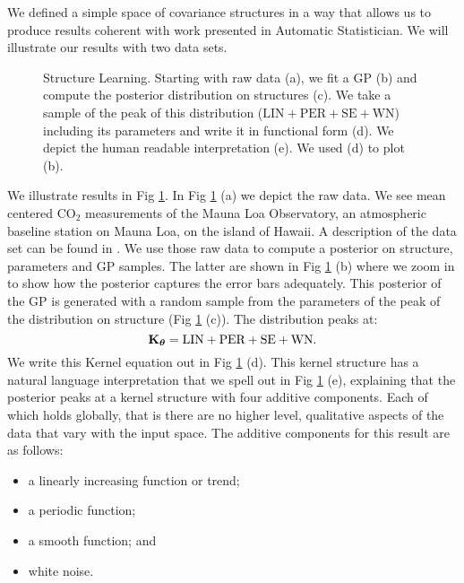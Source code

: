 

We defined a simple space of covariance structures in a way that allows us to produce results coherent with 
work presented in Automatic Statistician. We will illustrate our results with two data sets.

\begin{figure}
\centering

\caption{\small Structure Learning. Starting with raw data (a), we fit a \ac{GP}
(b) and compute the posterior distribution on structures (c). We take a sample
of the peak of this distribution ($\text{LIN}+\text{PER}+\text{SE}+\text{WN}$)
including its parameters and write it in functional form (d). We depict the
human readable interpretation (e). We used (d) to plot (b).}\label{fig:posterior}
\end{figure}
We illustrate results in Fig \ref{fig:posterior}. In Fig \ref{fig:posterior} (a) we depict the raw data. 
We see mean centered CO$_2$ measurements of the Mauna Loa Observatory, an atmospheric
baseline station on Mauna Loa, on the island of Hawaii. 
A description of the data set  can be found in  \citealp[][chapter 5]{rasmussen2006gaussian}.  
We use those raw data to compute a posterior on structure, parameters and \ac{GP}
samples.
The latter are shown in  Fig \ref{fig:posterior} (b)
where we zoom in to show how the posterior captures the error bars
adequately.
This posterior of the \ac{GP} is generated with a random sample from the parameters
of the peak of the distribution on structure (Fig \ref{fig:posterior} (c)).
The distribution peaks at:
\begin{equation}
\mathbf{K}_{\bm{\theta}}=\text{LIN} + \text{PER} + \text{SE} + \text{WN}.
\end{equation}
We write this Kernel equation out in Fig \ref{fig:posterior} (d).
This kernel structure has a natural language interpretation that we spell out in
Fig \ref{fig:posterior} (e), explaining that 
the posterior peaks at a kernel structure with four additive components.
Each of which holds globally, that is there are no higher level, qualitative aspects
of the data that vary with the input space. The additive components for this result are as follows:
\begin{itemize}
\item a linearly increasing function or trend; 
\item a periodic function;
\item a smooth function; and
\item white noise.
\end{itemize}
 



